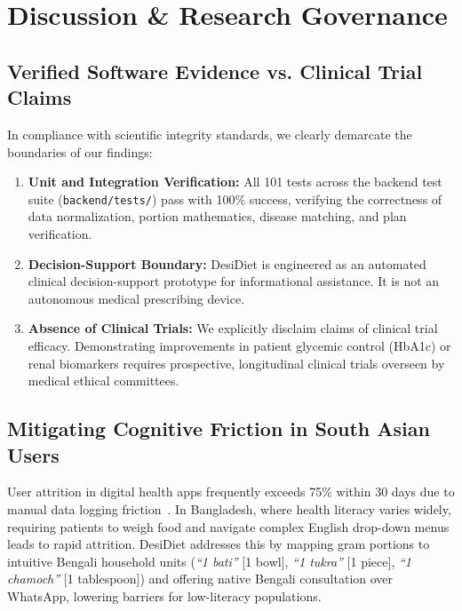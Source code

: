 \documentclass[5p,times,twocolumn]{elsarticle}
\makeatletter
\def\systemname{DesiDiet}%
\def\my@bx{bx}
\def\my@b{b}
\DeclareRobustCommand{\systemname}{%
  \texorpdfstring{%
    \ifx\f@series\my@bx
      DesiDiet%
    \else\ifx\f@series\my@b
      DesiDiet%
    \else
      \textsc{DesiDiet}%
    \fi\fi
  }{DesiDiet}%
}
\makeatother
\begin{document}
\section{Discussion \& Research Governance}
\label{sec:discussion}

\subsection{Verified Software Evidence vs. Clinical Trial Claims}
In compliance with scientific integrity standards, we clearly demarcate the boundaries of our findings:
\begin{enumerate}[leftmargin=*,itemsep=1.5pt]
  \item \textbf{Unit and Integration Verification:} All 101 tests across the backend test suite (\texttt{backend/tests/}) pass with 100\% success, verifying the correctness of data normalization, portion mathematics, disease matching, and plan verification.
  \item \textbf{Decision-Support Boundary:} \systemname{} is engineered as an automated clinical decision-support prototype for informational assistance. It is not an autonomous medical prescribing device.
  \item \textbf{Absence of Clinical Trials:} We explicitly disclaim claims of clinical trial efficacy. Demonstrating improvements in patient glycemic control (HbA1c) or renal biomarkers requires prospective, longitudinal clinical trials overseen by medical ethical committees.
\end{enumerate}

\subsection{Mitigating Cognitive Friction in South Asian Users}
User attrition in digital health apps frequently exceeds 75\% within 30 days due to manual data logging friction~\cite{villinger2019health}. In Bangladesh, where health literacy varies widely, requiring patients to weigh food and navigate complex English drop-down menus leads to rapid attrition. \systemname{} addresses this by mapping gram portions to intuitive Bengali household units (\textit{``1 bati''} [1 bowl], \textit{``1 tukra''} [1 piece], \textit{``1 chamoch''} [1 tablespoon]) and offering native Bengali consultation over WhatsApp, lowering barriers for low-literacy populations.
\end{document}
